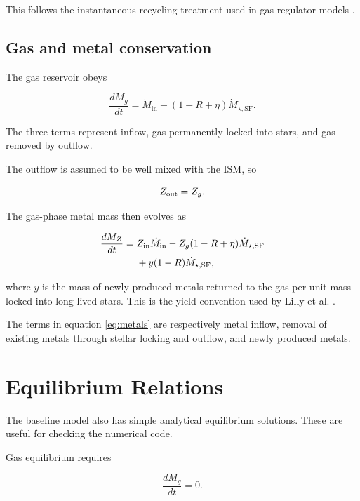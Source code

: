 \documentclass[10pt,a4paper]{article}
\newcommand{\SFR}{\dot{M}_{\star,\mathrm{SF}}}
\newcommand{\Mgin}{\dot{M}_{\mathrm{in}}}
\begin{document}
This follows the instantaneous-recycling treatment used in gas-regulator models \cite{lilly2013}.

\subsection{Gas and metal conservation}

The gas reservoir obeys

\begin{equation}
\frac{dM_g}{dt}
=
\Mgin
-
(1-R+\eta)\SFR.
\label{eq:gas}
\end{equation}

The three terms represent inflow, gas permanently locked into stars, and gas removed by outflow.

The outflow is assumed to be well mixed with the ISM, so

\begin{equation}
Z_{\rm out}=Z_g.
\end{equation}

The gas-phase metal mass then evolves as

\begin{align}
\frac{dM_Z}{dt}
={}&
Z_{\rm in}\Mgin
-
Z_g(1-R+\eta)\SFR
\nonumber\\
&+
y(1-R)\SFR,
\label{eq:metals}
\end{align}

where \(y\) is the mass of newly produced metals returned to the gas per unit mass locked into long-lived stars. This is the yield convention used by Lilly et al. \cite{lilly2013}.

The terms in equation \ref{eq:metals} are respectively metal inflow, removal of existing metals through stellar locking and outflow, and newly produced metals.

\section{Equilibrium Relations}

The baseline model also has simple analytical equilibrium solutions. These are useful for checking the numerical code.

Gas equilibrium requires

\begin{equation}
\frac{dM_g}{dt}=0.
\end{equation}
\end{document}
